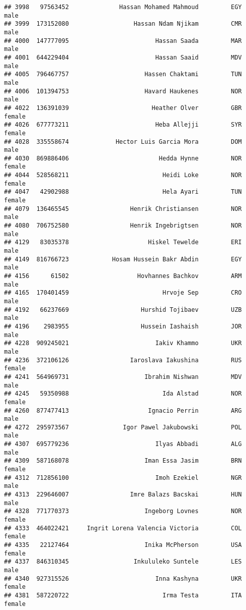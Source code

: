 \documentclass[]{article}
\begin{document}
\begin{verbatim}
## 3998   97563452              Hassan Mohamed Mahmoud         EGY   male
## 3999  173152080                  Hassan Ndam Njikam         CMR   male
## 4000  147777095                        Hassan Saada         MAR   male
## 4001  644229404                        Hassan Saaid         MDV   male
## 4005  796467757                     Hassen Chaktami         TUN   male
## 4006  101394753                     Havard Haukenes         NOR   male
## 4022  136391039                       Heather Olver         GBR female
## 4026  677773211                        Heba Allejji         SYR female
## 4028  335558674             Hector Luis Garcia Mora         DOM   male
## 4030  869886406                         Hedda Hynne         NOR female
## 4044  528568211                          Heidi Loke         NOR female
## 4047   42902988                          Hela Ayari         TUN female
## 4079  136465545                 Henrik Christiansen         NOR   male
## 4080  706752580                 Henrik Ingebrigtsen         NOR   male
## 4129   83035378                      Hiskel Tewelde         ERI   male
## 4149  816766723            Hosam Hussein Bakr Abdin         EGY   male
## 4156      61502                   Hovhannes Bachkov         ARM   male
## 4165  170401459                          Hrvoje Sep         CRO   male
## 4192   66237669                    Hurshid Tojibaev         UZB   male
## 4196    2983955                    Hussein Iashaish         JOR   male
## 4228  909245021                        Iakiv Khammo         UKR   male
## 4236  372106126                 Iaroslava Iakushina         RUS female
## 4241  564969731                     Ibrahim Nishwan         MDV   male
## 4245   59350988                          Ida Alstad         NOR female
## 4260  877477413                      Ignacio Perrin         ARG   male
## 4272  295973567               Igor Pawel Jakubowski         POL   male
## 4307  695779236                        Ilyas Abbadi         ALG   male
## 4309  587168078                     Iman Essa Jasim         BRN female
## 4312  712856100                        Imoh Ezekiel         NGR   male
## 4313  229646007                 Imre Balazs Bacskai         HUN   male
## 4328  771770373                     Ingeborg Lovnes         NOR female
## 4333  464022421     Ingrit Lorena Valencia Victoria         COL female
## 4335   22127464                     Inika McPherson         USA female
## 4337  846310345                  Inkululeko Suntele         LES   male
## 4340  927315526                        Inna Kashyna         UKR female
## 4381  587220722                          Irma Testa         ITA female

\end{verbatim}
\end{document}
